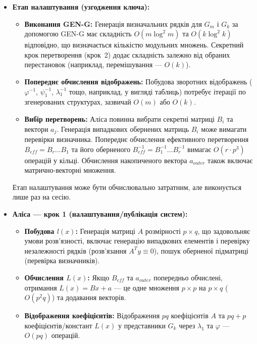 \begin{itemize}
    \item \textbf{Етап налаштування (узгодження ключа):}
    \begin{itemize}
        \item \textbf{Виконання GEN-G:} Генерація визначальних рядків для $G_m$ і $G_k$ за допомогою GEN-G має складність $O(m \log^2 m)$ та $O(k \log^2 k)$ відповідно, що визначається кількістю модульних множень. Секретний крок перетворення (крок~2) додає складність залежно від обраних перестановок (наприклад, перемішування — $O(k)$).
        \item \textbf{Попереднє обчислення відображень:} Побудова зворотних відображень ($\varphi^{-1}$, $\psi_1^{-1}$, $\lambda_1^{-1}$ тощо, наприклад, у вигляді таблиць) потребує ітерації по згенерованих структурах, зазвичай $O(m)$ або $O(k)$.
        \item \textbf{Вибір перетворень:} Аліса повинна вибрати секретні матриці $B_i$ та вектори $a_j$. Генерація випадкових обернених матриць $B_i$ може вимагати перевірки визначника. Попереднє обчислення ефективного перетворення $B_{eff} = B_r \dots B_1$ та його оберненого $B_{eff}^{-1} = B_1^{-1} \dots B_r^{-1}$ вимагає $O(r \cdot p^3)$ операцій у кільці. Обчислення накопиченого вектора $a_{outer}$ також включає матрично-векторні множення.
    \end{itemize}
    Етап налаштування може бути обчислювально затратним, але виконується лише раз на сесію.

    \item \textbf{Аліса — крок 1 (налаштування/публікація систем):}
    \begin{itemize}
        \item \textbf{Побудова $l(x)$:} Генерація матриці $A$ розмірності $p \times q$, що задовольняє умови розв'язності, включає генерацію випадкових елементів і перевірку незалежності рядків (розв'язання $A^T y \equiv 0$), пошук оберненої підматриці (перевірка визначників).
        \item \textbf{Обчислення $L(x)$:} Якщо $B_{eff}$ та $a_{outer}$ попередньо обчислені, отримання $L(x) = Bx + a$ — це одне множення $p \times p$ на $p \times q$ ($O(p^2 q)$) та додавання векторів.
        \item \textbf{Відображення коефіцієнтів:} Відображення $pq$ коефіцієнтів $A$ та $pq+p$ коефіцієнтів/констант $L(x)$ у представники $G_k$ через $\lambda_1$ та $\varphi$ — $O(pq)$ операцій.
    \end{itemize}


\end{itemize}
